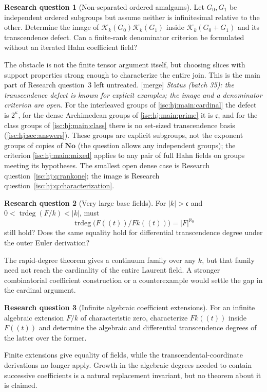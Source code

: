 \documentclass[11pt,letterpaper]{article}
\theoremstyle{definition}
\newtheorem{question}{Research question}
\theoremstyle{remark}
\newcommand{\No}{\mathbf{No}}
\newcommand{\K}[2]{\mathcal K_{#1}(#2)}
\newcommand{\trdeg}{\operatorname{trdeg}}
\newcommand{\mtag}{\textup{[merge]}}%
\newcommand{\cc}{\mathfrak c}
\numberwithin{equation}{section}
\begin{document}
\begin{question}[Non-separated ordered amalgams]\label{isc:cp:q:amalgams}
Let $G_0,G_1$ be independent ordered subgroups but assume neither is
infinitesimal relative to the other. Determine the image of
$\K{k}{G_0}\K{k}{G_1}$ inside $\K{k}{G_0+G_1}$ and its transcendence defect.
Can a finite-rank denominator criterion be formulated without an iterated
Hahn coefficient field?
\end{question}
The obstacle is not the finite tensor argument itself, but choosing slices
with support properties strong enough to characterize the entire join. This
is the main part of Research question~3 left untreated.
\mtag{} \emph{Status (batch 35): the transcendence defect is known for
explicit examples; the image and a denominator criterion are open.} For the
interleaved groups of \cref{isc:hj:main:cardinal} the defect is $2^\kappa$,
for the dense Archimedean groups of \cref{isc:hj:main:prime} it is $\cc$,
and for the class groups of \cref{isc:hj:main:class} there is no set-sized
transcendence basis (\cref{isc:hj:sec:answers}). These groups are explicit
subgroups, not the exponent groups of copies of $\No$ (the question allows
any independent groups); the criterion \cref{isc:hj:main:mixed} applies to
any pair of full Hahn fields on groups meeting its hypotheses. The smallest open dense case is Research
question~\ref{isc:hj:q:rankone}; the image is Research
question~\ref{isc:hj:q:characterization}.

\begin{question}[Very large base fields]\label{isc:cp:q:large}
For $|k|>\cc$ and $0<\trdeg(F/k)<|k|$, must
\[
 \trdeg\bigl(F((t))/F k((t))\bigr)=|F|^{\aleph_0}
\]
still hold? Does the same equality hold for differential transcendence
degree under the outer Euler derivation?
\end{question}
The rapid-degree theorem gives a continuum family over any $k$, but that
family need not reach the cardinality of the entire Laurent field. A
stronger combinatorial coefficient construction or a counterexample would
settle the gap in the cardinal argument.

\begin{question}[Infinite algebraic coefficient extensions]\label{isc:cp:q:algebraic}
For an infinite algebraic extension $F/k$ of characteristic zero,
characterize $F k((t))$ inside $F((t))$ and determine the algebraic and
differential transcendence degrees of the latter over the former.
\end{question}
Finite extensions give equality of fields, while the
transcendental-coordinate derivations no longer apply. Growth in the
algebraic degrees needed to contain successive coefficients is a natural
replacement invariant, but no theorem about it is claimed.
\end{document}
